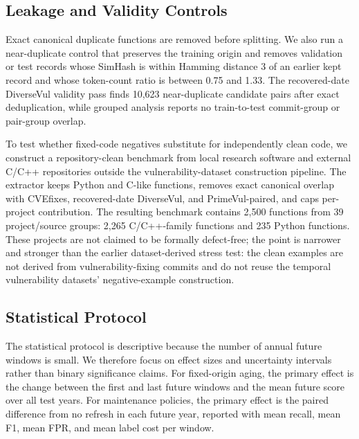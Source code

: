 \documentclass[a4paper,fleqn]{cas-dc}
\begin{document}
\subsection{Leakage and Validity Controls}

Exact canonical duplicate functions are removed before splitting. We also run a
near-duplicate control that preserves the training origin and removes
validation or test records whose SimHash is within Hamming distance 3 of an
earlier kept record and whose token-count ratio is between 0.75 and 1.33. The
recovered-date DiverseVul validity pass finds 10,623 near-duplicate candidate
pairs after exact deduplication, while grouped analysis reports no train-to-test
commit-group or pair-group overlap.

To test whether fixed-code negatives substitute for independently clean code,
we construct a repository-clean benchmark from local research software and
external C/C++ repositories outside the vulnerability-dataset construction
pipeline. The extractor keeps Python and C-like functions, removes exact
canonical overlap with CVEfixes, recovered-date DiverseVul, and PrimeVul-paired,
and caps per-project contribution. The resulting benchmark contains 2,500
functions from 39 project/source groups: 2,265 C/C++-family functions and 235
Python functions. These projects are not claimed to be formally defect-free; the
point is narrower and stronger than the earlier dataset-derived stress test:
the clean examples are not derived from vulnerability-fixing commits and do not
reuse the temporal vulnerability datasets' negative-example construction.

\subsection{Statistical Protocol}

The statistical protocol is descriptive because the number of annual future
windows is small. We therefore focus on effect sizes and uncertainty intervals
rather than binary significance claims. For fixed-origin aging, the primary
effect is the change between the first and last future windows and the mean
future score over all test years. For maintenance policies, the primary effect
is the paired difference from no refresh in each future year, reported with
mean recall, mean F1, mean FPR, and mean label cost per window.
\end{document}
